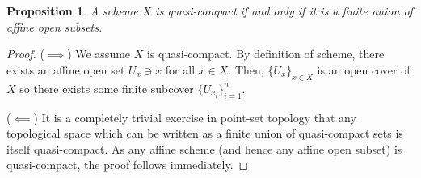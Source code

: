 \documentclass[english,letter,doublesided]{article}
\newcommand{\prob}[1]{\setcounter{section}{#1-1}\section{}}
\newcommand{\prt}[1]{\setcounter{subsection}{#1-1}\subsection{}}
\newtheorem*{proposition*}{Proposition}
\theoremstyle{remark}
\theoremstyle{definition}
\begin{document}
%
%
%
\prob{4}
\prt{1}\begin{proposition*}
	A scheme $X$ is quasi-compact if and only if it is a finite union of affine open subsets.
\end{proposition*}
\begin{proof}
	($\implies$) We assume $X$ is quasi-compact. By definition of scheme, there exists an affine open set $U_x\ni x$ for all $x\in X$. Then, $\{U_x\}_{x\in X}$ is an open cover of $X$ so there exists some finite subcover $\{U_{x_i}\}_{i=1}^n$.
	
	($\impliedby$) It is a completely trivial exercise in point-set topology that any topological space which can be written as a finite union of quasi-compact sets is itself quasi-compact. As any affine scheme (and hence any affine open subset) is quasi-compact, the proof follows immediately.   
\end{proof}
\end{document}
